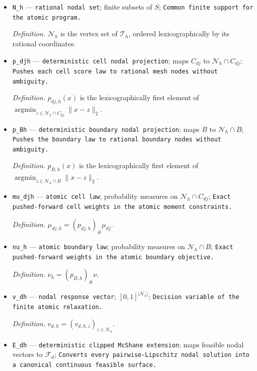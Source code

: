\documentclass{article}
\begin{document}
\begin{itemize}
  \item \texttt{N\_\allowbreak{}h} --- \texttt{rational nodal set}; finite subsets of \(S\); \texttt{Common finite support for the atomic program.}
  \par\smallskip\noindent\emph{Definition.} \(\mathcal N_h\) is the vertex set of \(\mathcal T_h\), ordered lexicographically by its rational coordinates.
  \item \texttt{p\_\allowbreak{}djh} --- \texttt{deterministic cell nodal projection}; maps \(C_{dj}\) to \(\mathcal N_h\cap C_{dj}\); \texttt{Pushes each cell score law to rational mesh nodes without ambiguity.}
  \par\smallskip\noindent\emph{Definition.} \(p_{dj,h}(x)\) is the lexicographically first element of \(\operatorname*{argmin}_{z\in\mathcal N_h\cap C_{dj}}\|x-z\|_2\).
  \item \texttt{p\_\allowbreak{}Bh} --- \texttt{deterministic boundary nodal projection}; maps \(B\) to \(\mathcal N_h\cap B\); \texttt{Pushes the boundary law to rational boundary nodes without ambiguity.}
  \par\smallskip\noindent\emph{Definition.} \(p_{B,h}(x)\) is the lexicographically first element of \(\operatorname*{argmin}_{z\in\mathcal N_h\cap B}\|x-z\|_2\).
  \item \texttt{mu\_\allowbreak{}djh} --- \texttt{atomic cell law}; probability measures on \(\mathcal N_h\cap C_{dj}\); \texttt{Exact pushed-\allowbreak{}forward cell weights in the atomic moment constraints.}
  \par\smallskip\noindent\emph{Definition.} \(\mu_{dj,h}=(p_{dj,h})_\#\mu_{dj}\).
  \item \texttt{nu\_\allowbreak{}h} --- \texttt{atomic boundary law}; probability measures on \(\mathcal N_h\cap B\); \texttt{Exact pushed-\allowbreak{}forward weights in the atomic boundary objective.}
  \par\smallskip\noindent\emph{Definition.} \(\nu_h=(p_{B,h})_\#\nu\).
  \item \texttt{v\_\allowbreak{}dh} --- \texttt{nodal response vector}; \([0,1]^{|\mathcal N_h|}\); \texttt{Decision variable of the finite atomic relaxation.}
  \par\smallskip\noindent\emph{Definition.} \(v_{d,h}=(v_{d,h,z})_{z\in\mathcal N_h}\).
  \item \texttt{E\_\allowbreak{}dh} --- \texttt{deterministic clipped McShane extension}; maps feasible nodal vectors to \(\mathcal F_d\); \texttt{Converts every pairwise-\allowbreak{}Lipschitz nodal solution into a canonical continuous feasible surface.}

\end{itemize}
\end{document}

